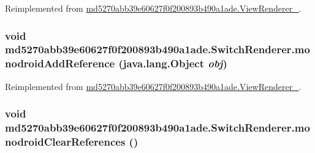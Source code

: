 Reimplemented from \hyperlink{classmd5270abb39e60627f0f200893b490a1ade_1_1_view_renderer__2_30528b2f26688d4ae24a58b2a1865a93}{md5270abb39e60627f0f200893b490a1ade.ViewRenderer\_}.\hypertarget{classmd5270abb39e60627f0f200893b490a1ade_1_1_switch_renderer_363c621199304e433d9aec4e62dfb8fa}{
\subsubsection[{monodroidAddReference}]{\setlength{\rightskip}{0pt plus 5cm}void md5270abb39e60627f0f200893b490a1ade.SwitchRenderer.monodroidAddReference (java.lang.Object {\em obj})}}
\label{classmd5270abb39e60627f0f200893b490a1ade_1_1_switch_renderer_363c621199304e433d9aec4e62dfb8fa}




Reimplemented from \hyperlink{classmd5270abb39e60627f0f200893b490a1ade_1_1_view_renderer__2_04a86dd6eb699648d23fe42d567c6962}{md5270abb39e60627f0f200893b490a1ade.ViewRenderer\_}.\hypertarget{classmd5270abb39e60627f0f200893b490a1ade_1_1_switch_renderer_269d9c853effc1c0864414f6ee8130f3}{
\subsubsection[{monodroidClearReferences}]{\setlength{\rightskip}{0pt plus 5cm}void md5270abb39e60627f0f200893b490a1ade.SwitchRenderer.monodroidClearReferences ()}}
\label{classmd5270abb39e60627f0f200893b490a1ade_1_1_switch_renderer_269d9c853effc1c0864414f6ee8130f3}




